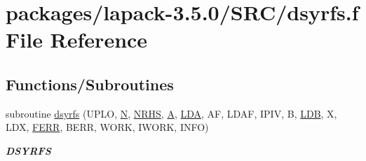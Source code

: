 \hypertarget{dsyrfs_8f}{}\section{packages/lapack-\/3.5.0/\+S\+R\+C/dsyrfs.f File Reference}
\label{dsyrfs_8f}
\subsection*{Functions/\+Subroutines}
\begin{DoxyCompactItemize}
\item 
subroutine \hyperlink{group__doubleSYcomputational_gad62575e82d54e086a0797a1af1b52e85}{dsyrfs} (U\+P\+L\+O, \hyperlink{polmisc_8c_a0240ac851181b84ac374872dc5434ee4}{N}, \hyperlink{example__user_8c_aa0138da002ce2a90360df2f521eb3198}{N\+R\+H\+S}, \hyperlink{classA}{A}, \hyperlink{example__user_8c_ae946da542ce0db94dced19b2ecefd1aa}{L\+D\+A}, A\+F, L\+D\+A\+F, I\+P\+I\+V, B, \hyperlink{example__user_8c_a50e90a7104df172b5a89a06c47fcca04}{L\+D\+B}, X, L\+D\+X, \hyperlink{superlu__enum__consts_8h_af00a42ecad444bbda75cde1b64bd7e72a78fd14d7abebae04095cfbe02928f153}{F\+E\+R\+R}, B\+E\+R\+R, W\+O\+R\+K, I\+W\+O\+R\+K, I\+N\+F\+O)
\begin{DoxyCompactList}\small\item\em {\bfseries D\+S\+Y\+R\+F\+S} \end{DoxyCompactList}\end{DoxyCompactItemize}
